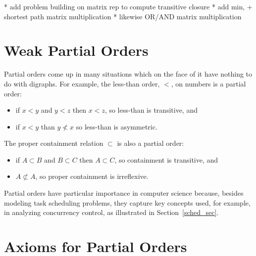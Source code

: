\begin{staffnotes}
* add problem building on matrix rep to compute transitive closure
* add min, + shortest path matrix  multiplication
* likewise OR/AND matrix multiplication
\end{staffnotes}

\section{Weak Partial Orders}\label{partial_order_sec}
Partial orders come up in many situations which on the face of it have
nothing to do with digraphs.  For example, the less-than order, $<$, on
numbers is a partial order:
\begin{itemize}
\item if $x <y$ and $y < z$ then $x < z$, so less-than is transitive, and
\item  if $x <y$ than $y \not< x$ so less-than is asymmetric.
\end{itemize}
 The proper containment relation $\subset$ is also a
partial order:
\begin{itemize}
\item if $A \subset B$ and $B \subset C$ then $A \subset C$,
so containment is transitive, and
\item  $A \not\subset A$, so proper containment is irreflexive.
\end{itemize}


\iffalse
, but so is the containment relation on sets
and the divisibility relation on integers.
\fi

Partial orders have particular importance in computer science because,
besides modeling task scheduling problems, they capture key concepts
used, for example, in analyzing concurrency control, as illustrated in
Section~\ref{sched_sec}.

\iffalse

\section{Axioms for Partial Orders}

